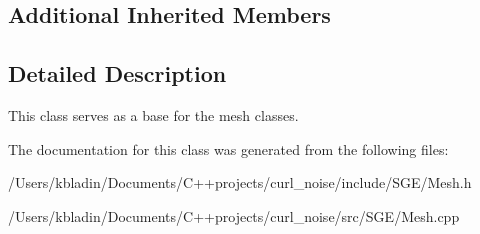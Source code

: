 \subsection*{Additional Inherited Members}


\subsection{Detailed Description}
This class serves as a base for the mesh classes. 

The documentation for this class was generated from the following files\-:\begin{DoxyCompactItemize}
\item 
/\-Users/kbladin/\-Documents/\-C++projects/curl\-\_\-noise/include/\-S\-G\-E/Mesh.\-h\item 
/\-Users/kbladin/\-Documents/\-C++projects/curl\-\_\-noise/src/\-S\-G\-E/Mesh.\-cpp\end{DoxyCompactItemize}
